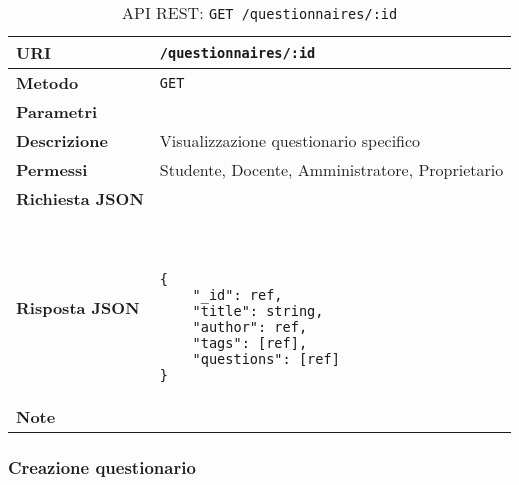         \begin{table}[H]
            \begin{center}
                \begin{tabular}{p{} p{}}
                    \toprule
                    \textbf{URI} & \texttt{/questionnaires/:id} \\ \midrule
                    \textbf{Metodo} & \texttt{GET} \\ \midrule
                    \textbf{Parametri} & \\ \midrule
                    \textbf{Descrizione} & Visualizzazione questionario specifico \\ \midrule
                    \textbf{Permessi} & Studente, Docente, Amministratore, Proprietario  \\ \midrule
                    \textbf{Richiesta JSON} & \\ \midrule
                    \textbf{Risposta JSON} & \
                        \begin{lstlisting}[basicstyle={\ttfamily}]
{
    "_id": ref,
    "title": string,
    "author": ref,
    "tags": [ref],
    "questions": [ref] 
}
                        \end{lstlisting}
                        \\ \midrule
                    \textbf{Note} & \\
                    \bottomrule
                \end{tabular}
                \caption{API REST: \texttt{GET /questionnaires/:id}}
            \end{center}
        \end{table}

    \subsubsection{Creazione questionario}

